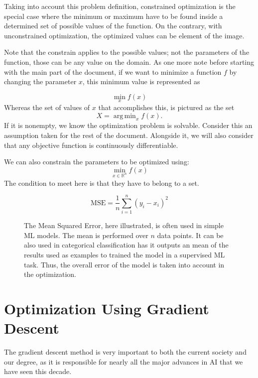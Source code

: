 \documentclass[]{article}
\DeclareMathOperator*{\argmin}{arg\,min}
\theoremstyle{definition}
\begin{document}
Taking into account this problem definition, constrained optimization is the special case where the minimum or maximum have to be found inside a determined set of possible values of the function. On the contrary, with unconstrained optimization, the optimized values can be element of the image.

Note that the constrain applies to the possible values; not the parameters of the function, those can be any value on the domain. As one more note before starting with the main part of the document, if we want to minimize a function $f$ by changing the parameter $x$, this minimum value is represented as

\begin{equation*}\label{eq:min_problem}
	\min_x f(x)
\end{equation*}
Whereas the set of values of $x$ that accomplishes this, is pictured as the set 
\begin{equation*}
	X =\argmin_x f(x).
\end{equation*}
If it is nonempty, we know the optimization problem is solvable. Consider this an assumption taken for the rest of the document. Alongside it, we will also consider that any objective function is continuously differentiable. 

We can also constrain the parameters to be optimized using:
\begin{equation*}
	\min_{x\in\mathbb{R}^n} f(x)
\end{equation*}
The condition to meet here is that they have to belong to a set. 



\begin{figure}
	\centering
	\captionsetup{width=.9\linewidth}
	\begin{equation*}
		\text{MSE} = \frac{1}{n} \sum_{i=1}^n \left(y_i - x_i\right)^2
	\end{equation*}
	\caption{The Mean Squared Error, here illustrated, is often used in simple ML models. The mean is performed over $n$ data points. It can be also used in categorical classification has it outputs an mean of the results used as examples to trained the model in a supervised ML task. Thus, the overall error of the model is taken into account in the optimization.}
	\label{fig:mse}
\end{figure}




\section{Optimization Using Gradient Descent}
The gradient descent method is very important to both the current society and our degree, as it is responsible for nearly all the major advances in AI that we have seen this decade.
\end{document}
